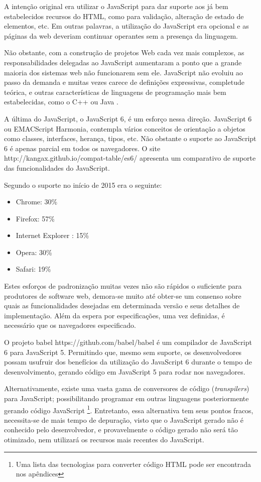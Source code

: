 A intenção original era utilizar o JavaScript para dar suporte aos já
bem estabelecidos recursos do HTML, como para validação, alteração
de estado de elementos, etc. Em outras palavras, a utilização do
JavaScript era opcional e as páginas da web deveriam continuar
operantes sem a presença da linguagem.

Não obstante, com a construção de projetos Web cada vez mais complexos, as
responsabilidades delegadas ao JavaScript aumentaram a ponto que a
grande maioria dos sistemas web não funcionarem sem ele.
JavaScript não evoluiu ao passo da demanda e muitas vezes carece de
definições expressivas, completude teórica, e outras características
de linguagens de programação mais bem estabelecidas, como o C++ ou
Java \autocite{crossPlatformMobileGame}.

A última do JavaScript, o JavaScript 6, é um esforço nessa direção.
JavaScript 6 ou EMACScript Harmonia, contempla vários conceitos de
orientação a objetos como classes, interfaces, herança, tipos, etc.
Não obstante o suporte ao JavaScript 6 é apenas parcial em todos
os navegadores. O site http://kangax.github.io/compat-table/es6/
apresenta um comparativo de suporte das funcionalidades do JavaScript.

Segundo \cite{ecmaSupport} o suporte no início de 2015 era o seguinte:

\begin{itemize}
    \item Chrome: 30\%
    \item Firefox: 57\%
    \item Internet Explorer : 15\%
    \item Opera: 30\%
    \item Safari: 19\%
\end{itemize}

Estes esforços de padronização muitas vezes não são rápidos
o suficiente para produtores de software web, demora-se muito até
obter-se um consenso sobre quais as funcionalidades desejadas em
determinada versão e seus detalhes de implementação. Além da
espera por especificações, uma vez definidas, é necessário que os
navegadores especificado.

O projeto babel https://github.com/babel/babel é um compilador de
JavaScript 6 para JavaScript 5. Permitindo que, mesmo sem suporte, os
desenvolvedores possam usufruir dos benefícios da utilização do
JavaScript 6 durante o tempo de desenvolvimento, gerando código em
JavaScript 5 para rodar nos navegadores.

Alternativamente, existe uma vasta gama de conversores de código
(\textit{transpilers}) para JavaScript; possibilitando programar
em outras linguagens posteriormente gerando código JavaScript
\footnote{Uma lista das tecnologias para converter código HTML pode ser encontrada nos apêndices}.
Entretanto, essa alternativa tem seus pontos fracos, necessita-se
de mais tempo de depuração, visto que o JavaScript gerado não é
conhecido pelo desenvolvedor, e provavelmente o código gerado não
será tão otimizado, nem utilizará os recursos mais recentes do
JavaScript.

